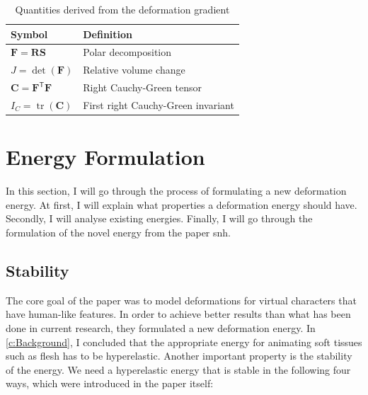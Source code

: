 \setlength{\tabcolsep}{0.5em} %
{\renewcommand{\arraystretch}{1.1}%
\begin{table}[!htbp]
\centering
    \begin{tabular}{ | l | l |}
    \hline
    \textbf{Symbol} & \textbf{Definition} \\ \hline
    $\mathbf{F} = \mathbf{RS}$ & Polar decomposition \\ \hline
    $J=\operatorname{det}(\mathbf{F})$ & Relative volume change \\ \hline
    $\mathbf{C}=\mathbf{F}^\mathsf{T} \mathbf{F}$ & Right Cauchy-Green tensor  \\ \hline	
    $I_{C}=\operatorname{tr}(\mathbf{C})$ & First right Cauchy-Green invariant \\ \hline
    \end{tabular}
    \caption[Quantities derived from the Deformation Gradient]{Quantities derived from the deformation gradient}
\label{table:gradient_quantities}
\end{table}

\newpage
\section{Energy Formulation}
In this section, I will go through the process of formulating a new deformation energy. At first, I will explain what properties a deformation energy should have. Secondly, I will analyse existing energies. Finally, I will go through the formulation of the novel energy from the paper \acrshort{snh}.

\subsection{Stability} 
\label{ss:stability}
The core goal of the paper was to model deformations for virtual characters that have human-like features. In order to achieve better results than what has been done in current research, they formulated a new deformation energy. In \autoref{c:Background}, I concluded that the appropriate energy for animating soft tissues such as flesh has to be hyperelastic. Another important property is the stability of the energy. We need a hyperelastic energy that is stable in the following four ways, which were introduced in the paper itself:

}
